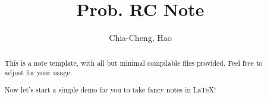 \documentclass[a4paper]{report}
\author{Chia-Cheng, Hao}
\title{Prob. RC Note}
\begin{document}
\maketitle

\begin{abstract}
	This is a note template, with all but minimal compilable files provided. Feel free to adjust for your usage.

	Now let's start a simple demo for you to take fancy notes in \LaTeX!
\end{abstract}

\newpage

\tableofcontents


\newpage
\appendix
\appendixpage



\newpage
\printbibliography
\end{document}
